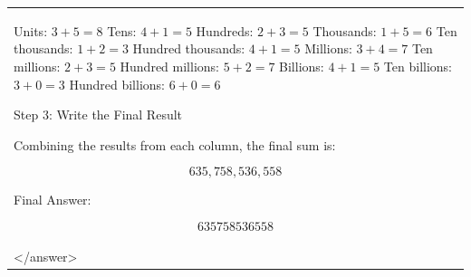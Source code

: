 \documentclass[11pt]{article}
\begin{document}
\begin{table}[htbp]
{\begin{tabular}{p{}}
    Units: $3 + 5 = 8$
    Tens: $4 + 1 = 5$
    Hundreds: $2 + 3 = 5$
    Thousands: $1 + 5 = 6$
    Ten thousands: $1 + 2 = 3$
    Hundred thousands: $4 + 1 = 5$
    Millions: $3 + 4 = 7$
    Ten millions: $2 + 3 = 5$
    Hundred millions: $5 + 2 = 7$
    Billions: $4 + 1 = 5$
    Ten billions: $3 + 0 = 3$
    Hundred billions: $6 + 0 = 6$

    Step 3: Write the Final Result

    Combining the results from each column, the final sum is:

    \[
    635,\!758,\!536,\!558
    \]


    Final Answer:

    $$\boxed{635758536558}$$
    \\
    \textless /answer\textgreater
    \\
    \bottomrule
  \end{tabular}
}
\end{table}
\end{document}

